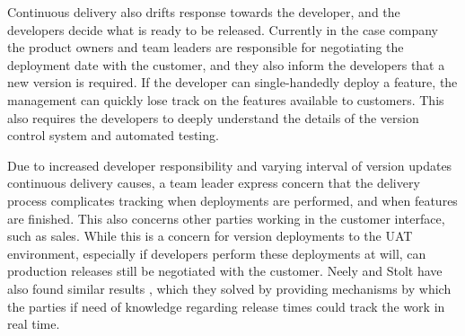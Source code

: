 \documentclass[english]{tktltiki2}
\theoremstyle{definition}
\theoremstyle{remark}
\begin{document}

Continuous delivery also drifts response towards the developer, and the developers decide what is ready to be released. Currently in the case company the product owners and team leaders are responsible for negotiating the deployment date with the customer, and they also inform the developers that a new version is required. If the developer can single-handedly deploy a feature, the management can quickly lose track on the features available to customers. This also requires the developers to deeply understand the details of the version control system and automated testing. 

Due to increased developer responsibility and varying interval of version updates continuous delivery causes, a team leader express concern that the delivery process complicates tracking when deployments are performed, and when features are finished. This also concerns other parties working in the customer interface, such as sales. While this is a concern for version deployments to the UAT environment, especially if developers perform these deployments at will, can production releases still be negotiated with the customer. Neely and Stolt have also found similar results \cite{neely2013continuous}, which they solved by providing mechanisms by which the parties if need of knowledge regarding release times could track the work in real time.  



\end{document}
